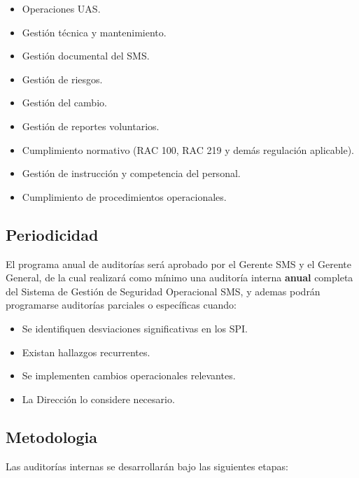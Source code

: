 \begin{itemize}
    \item Operaciones UAS.

    \item Gestión técnica y mantenimiento.

    \item Gestión documental del SMS.

    \item Gestión de riesgos.

    \item Gestión del cambio.

    \item Gestión de reportes voluntarios.

    \item Cumplimiento normativo (RAC 100, RAC 219 y demás regulación aplicable).

    \item Gestión de instrucción y competencia del personal.

    \item Cumplimiento de procedimientos operacionales.
\end{itemize}

\subsection{Periodicidad}
El programa anual de auditorías será aprobado por el Gerente SMS y el Gerente General, de la cual realizará como mínimo una auditoría interna \textbf{anual} completa del Sistema de Gestión de Seguridad Operacional SMS, y ademas podrán programarse auditorías parciales o específicas cuando:

\begin{itemize}
    \item Se identifiquen desviaciones significativas en los SPI.

    \item Existan hallazgos recurrentes.

    \item Se implementen cambios operacionales relevantes.

    \item La Dirección lo considere necesario.
\end{itemize}

\subsection{Metodologia}
Las auditorías internas se desarrollarán bajo las siguientes etapas:

